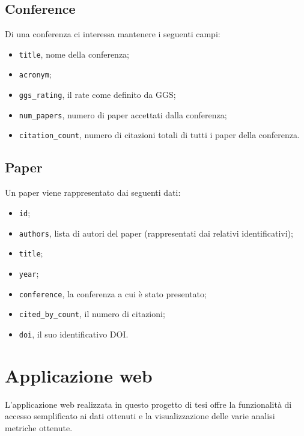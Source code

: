 \subsection{Conference}

Di una conferenza ci interessa mantenere i seguenti campi:
\begin{itemize}
  \item \texttt{title}, nome della conferenza;
  \item \texttt{acronym};
  \item \texttt{ggs\_rating}, il rate come definito da GGS;
  \item \texttt{num\_papers}, numero di paper accettati dalla conferenza;
  \item \texttt{citation\_count}, numero di citazioni totali di tutti i paper della conferenza.
\end{itemize}

\subsection{Paper}

Un paper viene rappresentato dai seguenti dati:

\begin{itemize}
  \item \texttt{id};
  \item \texttt{authors}, lista di autori del paper (rappresentati dai relativi identificativi);
  \item \texttt{title};
  \item \texttt{year};
  \item \texttt{conference}, la conferenza a cui è stato presentato;
  \item \texttt{cited\_by\_count}, il numero di citazioni;
  \item \texttt{doi}, il suo identificativo DOI.
\end{itemize}


\section{Applicazione web}

L'applicazione web realizzata in questo progetto di tesi offre la funzionalità
di accesso semplificato ai dati ottenuti e la visualizzazione
delle varie analisi metriche ottenute.

